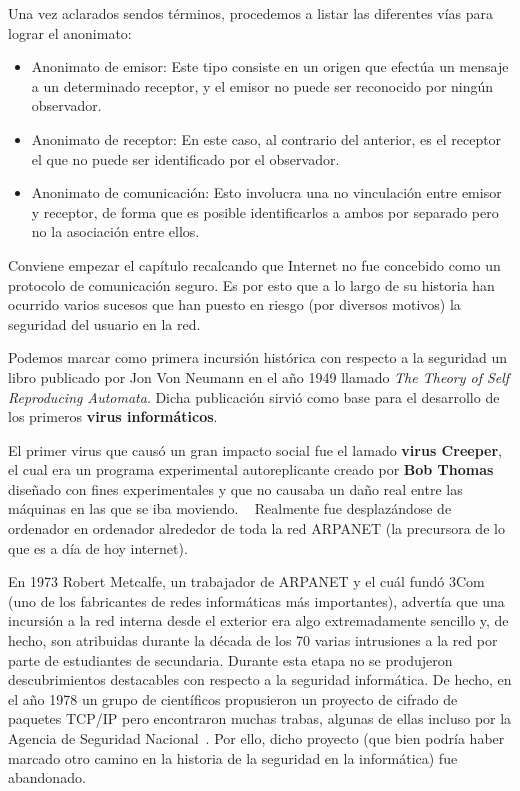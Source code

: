 Una vez aclarados sendos términos, procedemos a listar las diferentes vías para lograr el anonimato:

\begin{itemize}
	\item Anonimato de emisor: Este tipo consiste en un origen que efectúa un mensaje a un determinado receptor, y el emisor no puede ser reconocido por ningún observador.
	\item Anonimato de receptor: En este caso, al contrario del anterior, es el receptor el que no puede ser identificado por el observador.
	\item Anonimato de comunicación: Esto involucra una no vinculación entre emisor y receptor, de forma que es posible identificarlos a ambos por separado pero no la asociación entre ellos.

\end{itemize}

 \label{sec:historia}

Conviene empezar el capítulo recalcando que Internet no fue concebido como un protocolo de comunicación seguro. 
Es por esto que a lo largo de su historia han ocurrido varios sucesos que han puesto en riesgo (por diversos motivos) la seguridad del usuario en la red.

Podemos marcar como primera incursión histórica con respecto a la seguridad un libro publicado por Jon Von Neumann en el año 1949 llamado \textit{The Theory of Self Reproducing Automata}. Dicha publicación sirvió como  base para el desarrollo de los primeros \textbf{virus informáticos}.~\cite{article:automata}

El primer virus que causó un gran impacto social fue el lamado \textbf{virus Creeper}, el cual era un programa experimental autoreplicante creado por \textbf{Bob Thomas} diseñado con fines experimentales y que no causaba un daño real entre las máquinas en las que se iba moviendo. ~\cite{article:motivationvirus}
Realmente fue desplazándose de ordenador en ordenador alrededor de toda la red ARPANET (la precursora de lo que es a día de hoy internet).

En 1973 Robert Metcalfe, un trabajador de ARPANET y el cuál fundó 3Com (uno de los fabricantes de redes informáticas más importantes), advertía que una incursión a la red interna desde el exterior era algo extremadamente sencillo y, de hecho, son atribuidas durante la década de los 70 varias intrusiones a la red por parte de estudiantes de secundaria. 
Durante esta etapa no se produjeron descubrimientos destacables con respecto a la seguridad informática. De hecho, en el año 1978 un grupo de científicos propusieron un proyecto de cifrado de paquetes TCP/IP pero encontraron muchas trabas, algunas de ellas incluso por la Agencia de Seguridad Nacional~\cite{article:nsa_tcp}. Por ello, dicho proyecto (que bien podría haber marcado otro camino en la historia de la seguridad en la informática) fue abandonado. 

